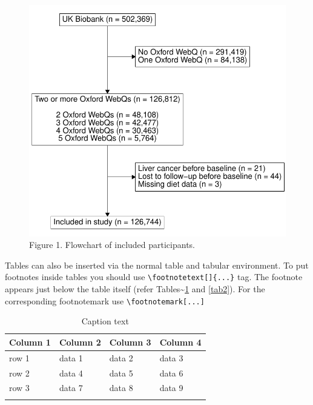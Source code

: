 \documentclass[sn-vancouver,Numbered,pdflatex]{sn-jnl}
\theoremstyle{remark}
\theoremstyle{definition}
\begin{document}
\pagebreak

\begin{figure}
\includegraphics{Springer-test_files/figure-latex/fig 1 flowchart-1} \caption{Figure 1. Flowchart of included participants.}\label{fig:fig 1 flowchart}
\end{figure}

\pagebreak

Tables can also be inserted via the normal table and tabular
environment. To put footnotes inside tables you should use
\texttt{\textbackslash{}footnotetext{[}{]}\{...\}} tag. The footnote
appears just below the table itself (refer
Tables\textasciitilde{}\ref{tab1} and \ref{tab2}). For the corresponding
footnotemark use \texttt{\textbackslash{}footnotemark{[}...{]}}

\begin{table}[h]
\caption{Caption text}\label{tab1}%
\begin{tabular}{@{}llll@{}}
\toprule
Column 1 & Column 2  & Column 3 & Column 4\\
\midrule
row 1    & data 1   & data 2  & data 3  \\
row 2    & data 4   & data 5\footnotemark[1]  & data 6  \\
row 3    & data 7   & data 8  & data 9\footnotemark[2]  \\
\botrule
\end{tabular}
\end{table}
\end{document}
